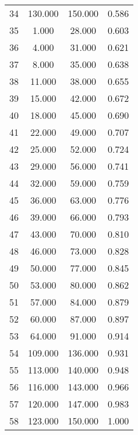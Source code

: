 \begin{tabular}{cccc}
  34 & 130.000 & 150.000 & 0.586 \\ 
  35 & 1.000 & 28.000 & 0.603 \\ 
  36 & 4.000 & 31.000 & 0.621 \\ 
  37 & 8.000 & 35.000 & 0.638 \\ 
  38 & 11.000 & 38.000 & 0.655 \\ 
  39 & 15.000 & 42.000 & 0.672 \\ 
  40 & 18.000 & 45.000 & 0.690 \\ 
  41 & 22.000 & 49.000 & 0.707 \\ 
  42 & 25.000 & 52.000 & 0.724 \\ 
  43 & 29.000 & 56.000 & 0.741 \\ 
  44 & 32.000 & 59.000 & 0.759 \\ 
  45 & 36.000 & 63.000 & 0.776 \\ 
  46 & 39.000 & 66.000 & 0.793 \\ 
  47 & 43.000 & 70.000 & 0.810 \\ 
  48 & 46.000 & 73.000 & 0.828 \\ 
  49 & 50.000 & 77.000 & 0.845 \\ 
  50 & 53.000 & 80.000 & 0.862 \\ 
  51 & 57.000 & 84.000 & 0.879 \\ 
  52 & 60.000 & 87.000 & 0.897 \\ 
  53 & 64.000 & 91.000 & 0.914 \\ 
  54 & 109.000 & 136.000 & 0.931 \\ 
  55 & 113.000 & 140.000 & 0.948 \\ 
  56 & 116.000 & 143.000 & 0.966 \\ 
  57 & 120.000 & 147.000 & 0.983 \\ 
  58 & 123.000 & 150.000 & 1.000 \\ 
   \hline
\end{tabular}
